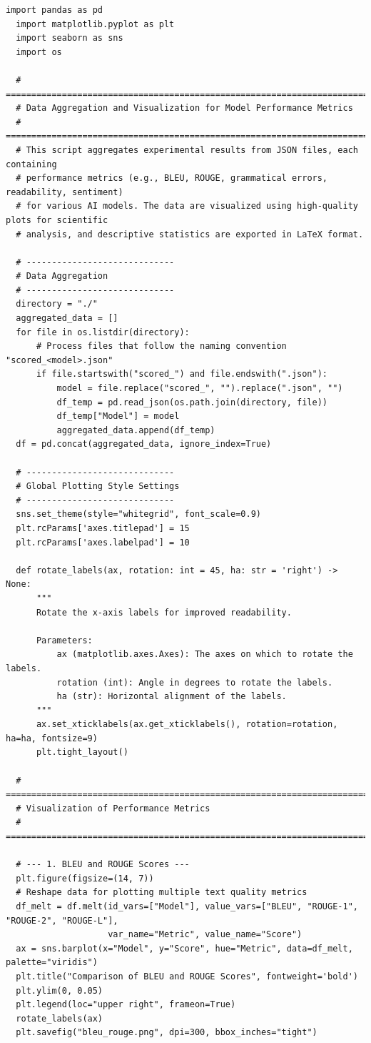 \begin{lstlisting}[style=Python, caption={Python-qualitative-data-analysis}, captionpos=b]
  import pandas as pd
  import matplotlib.pyplot as plt
  import seaborn as sns
  import os
  
  # =============================================================================
  # Data Aggregation and Visualization for Model Performance Metrics
  # =============================================================================
  # This script aggregates experimental results from JSON files, each containing 
  # performance metrics (e.g., BLEU, ROUGE, grammatical errors, readability, sentiment)
  # for various AI models. The data are visualized using high-quality plots for scientific 
  # analysis, and descriptive statistics are exported in LaTeX format.
  
  # -----------------------------
  # Data Aggregation
  # -----------------------------
  directory = "./"
  aggregated_data = []
  for file in os.listdir(directory):
      # Process files that follow the naming convention "scored_<model>.json"
      if file.startswith("scored_") and file.endswith(".json"):
          model = file.replace("scored_", "").replace(".json", "")
          df_temp = pd.read_json(os.path.join(directory, file))
          df_temp["Model"] = model
          aggregated_data.append(df_temp)
  df = pd.concat(aggregated_data, ignore_index=True)
  
  # -----------------------------
  # Global Plotting Style Settings
  # -----------------------------
  sns.set_theme(style="whitegrid", font_scale=0.9)
  plt.rcParams['axes.titlepad'] = 15
  plt.rcParams['axes.labelpad'] = 10
  
  def rotate_labels(ax, rotation: int = 45, ha: str = 'right') -> None:
      """
      Rotate the x-axis labels for improved readability.
  
      Parameters:
          ax (matplotlib.axes.Axes): The axes on which to rotate the labels.
          rotation (int): Angle in degrees to rotate the labels.
          ha (str): Horizontal alignment of the labels.
      """
      ax.set_xticklabels(ax.get_xticklabels(), rotation=rotation, ha=ha, fontsize=9)
      plt.tight_layout()
  
  # =============================================================================
  # Visualization of Performance Metrics
  # =============================================================================
  
  # --- 1. BLEU and ROUGE Scores ---
  plt.figure(figsize=(14, 7))
  # Reshape data for plotting multiple text quality metrics
  df_melt = df.melt(id_vars=["Model"], value_vars=["BLEU", "ROUGE-1", "ROUGE-2", "ROUGE-L"], 
                    var_name="Metric", value_name="Score")
  ax = sns.barplot(x="Model", y="Score", hue="Metric", data=df_melt, palette="viridis")
  plt.title("Comparison of BLEU and ROUGE Scores", fontweight='bold')
  plt.ylim(0, 0.05)
  plt.legend(loc="upper right", frameon=True)
  rotate_labels(ax)
  plt.savefig("bleu_rouge.png", dpi=300, bbox_inches="tight")
  

\end{lstlisting}

